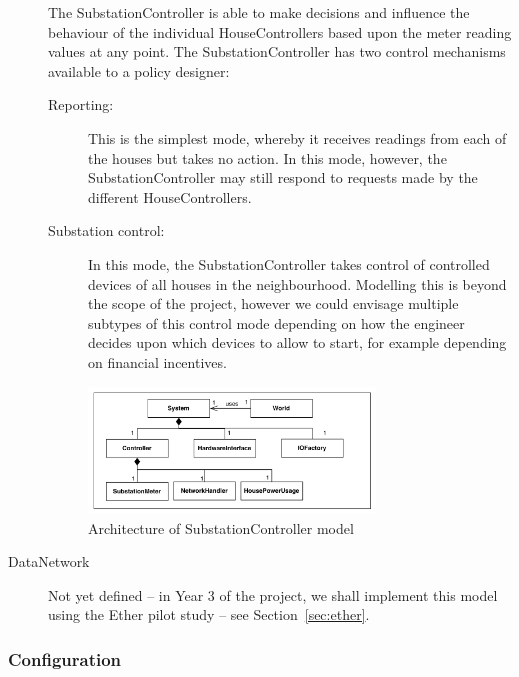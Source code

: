 \begin{description}
The SubstationController is able to make decisions and influence the behaviour of the individual HouseControllers based upon the meter reading values at any point. The SubstationController has two control mechanisms available to a policy designer:


\begin{description}
\item[Reporting:] This is the simplest mode, whereby it receives readings from each of the houses but takes no action. In this mode, however, the SubstationController may still respond to requests made by the different HouseControllers.

\item[Substation control:] In this mode, the SubstationController takes control of controlled devices of all houses in the neighbourhood. Modelling this is beyond the scope of the project, however we could envisage multiple subtypes of this control mode depending on how the engineer decides upon which devices to allow to start, for example depending on financial incentives.
\end{description}


\begin{figure}[htb]
\begin{center}
\includegraphics[width=0.75\textwidth]{smartgrid/sscontrollerarch}
\caption{Architecture of SubstationController model}
\label{fig:vdm-ss}
\end{center}
\end{figure}

\item[DataNetwork] Not yet defined -- in Year 3 of the project, we shall implement this model using the Ether pilot study -- see Section~\ref{sec:ether}.

\end{description}



\subsubsection{Configuration}

